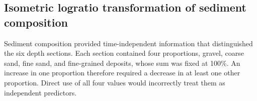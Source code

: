 %
%

\subsection{Isometric logratio transformation of sediment composition}
\label{subsec:ilr_transformation}

Sediment composition provided time-independent information that distinguished the six depth sections. Each section contained four proportions, gravel, coarse sand, fine sand, and fine-grained deposits, whose sum was fixed at 100\%. An increase in one proportion therefore required a decrease in at least one other proportion. Direct use of all four values would incorrectly treat them as independent predictors.

